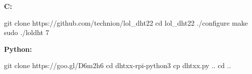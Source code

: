 \textbf{C:}

\begin{console}
git clone https://github.com/technion/lol_dht22
cd lol_dht22
./configure
make
sudo ./loldht 7
\end{console}

\textbf{Python:}

\begin{console}
git clone https://goo.gl/D6m2h6
cd dhtxx-rpi-python3
cp dhtxx.py ..
cd ..
\end{console}

\lstset{language=Python, caption=, 
        label=DHT22Program, frame=single, basicstyle=\ttfamily
	      \footnotesize, breakatwhitespace=false, showstringspaces=false, 
        showtabs=false, tabsize=2 }

